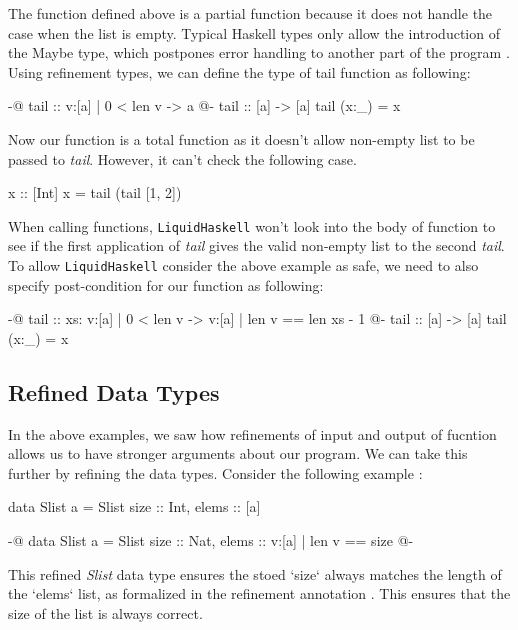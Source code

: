 \documentclass[]{rptuseminar}
\begin{document}
The function defined above is a partial function because it does not handle the case when the list is empty. 
 Typical Haskell types only allow the introduction of the Maybe type, which postpones error 
 handling to another part of the program \cite{jhala_programming_2020}. Using refinement types, we can define the type of tail function as following:

\begin{haskell}
 {-@ tail :: {v:[a] | 0 < len v} -> a @-}
 tail :: [a] -> [a]
 tail (x:_) = x
\end{haskell}

Now our function is a total function as it doesn't allow non-empty list to be passed to \textit{tail}. However, it can't 
check the following case.

\begin{haskell}
 x :: [Int]
 x = tail (tail [1, 2])
\end{haskell}

When calling functions, \texttt{LiquidHaskell} won't look into the body of function to see if the first application of \textit{tail} gives the valid non-empty list to the second \textit{tail}.
To allow \texttt{LiquidHaskell} consider the above example as safe, we need to also specify post-condition for our function as following:

\begin{haskell}
 {-@ tail :: xs: {v:[a] | 0 < len v} -> {v:[a] | len v == len xs - 1} @-}
 tail :: [a] -> [a]
 tail (x:_) = x
\end{haskell}

\subsection{Refined Data Types}
In the above examples, we saw how refinements of input and output of fucntion allows us to have stronger arguments about our program. 
We can take this further by refining the data types. Consider the following example \cite{jhala_programming_2020}:

\begin{haskell}
  data Slist a = Slist { size :: Int, elems :: [a] }

  {-@ data Slist a = Slist { size :: Nat, elems :: {v:[a] | len v == size} } @-}
\end{haskell}

This refined \textit{Slist} data type ensures the stoed `size` always matches the length of the `elems` list, 
as formalized in the refinement annotation \cite{jhala_programming_2020} . 
This ensures that the size of the list is always correct.
\end{document}
